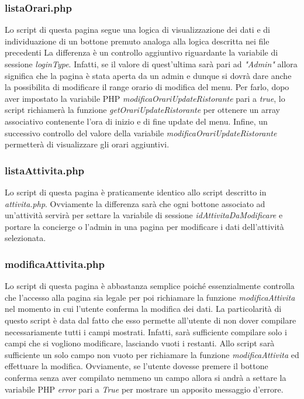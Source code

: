 \documentclass [a4paper, 12pt]{book}
\begin{document}
\subsubsection{listaOrari.php}
Lo script di questa pagina segue una logica di visualizzazione dei dati e di individuazione di un bottone premuto analoga alla logica descritta nei file precedenti La differenza è un controllo aggiuntivo riguardante la variabile di sessione \textit{loginType}. Infatti, se il valore di quest'ultima sarà pari ad \textit{"Admin"} allora significa che la pagina è stata aperta da un admin e dunque si dovrà dare anche la possibilita di modificare il range orario di modifica del menu. Per farlo, dopo aver impostato la variabile PHP \textit{modificaOrariUpdateRistorante} pari a \textit{true}, lo script richiamerà la funzione \textit{getOrariUpdateRistorante} per ottenere un array associativo contenente l'ora di inizio e di fine update del menu. Infine, un successivo controllo del valore della variabile \textit{modificaOrariUpdateRistorante} permetterà di visualizzare gli orari aggiuntivi.

\subsubsection{listaAttivita.php}
Lo script di questa pagina è praticamente identico allo script descritto in \textit{attivita.php}. Ovviamente la differenza sarà che ogni bottone associato ad un'attività servirà per settare la variabile di sessione \textit{idAttivitaDaModificare} e portare la concierge o l'admin in una pagina per modificare i dati dell'attività selezionata.

\subsubsection{modificaAttivita.php}
Lo script di questa pagina è abbastanza semplice poiché essenzialmente controlla che l'accesso alla pagina sia legale per poi richiamare la funzione \textit{modificaAttivita} nel momento in cui l'utente conferma la modifica dei dati. La particolarità di questo script è data dal fatto che esso permette all'utente di non dover compilare necessariamente tutti i campi mostrati. Infatti, sarà sufficiente compilare solo i campi che si vogliono modificare, lasciando vuoti i restanti. Allo script sarà sufficiente un solo campo non vuoto per richiamare la funzione \textit{modificaAttivita} ed effettuare la modifica. Ovviamente, se l'utente dovesse premere il bottone conferma senza aver compilato nemmeno un campo allora si andrà a settare la variabile PHP \textit{error} pari a \textit{True} per mostrare un apposito messaggio d'errore.
\end{document}
